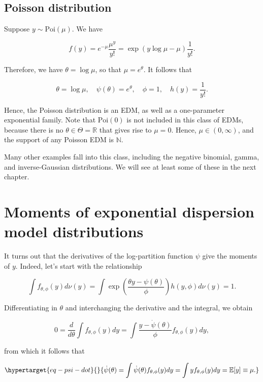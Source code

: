 \documentclass[
  11pt,
  letterpaper,
  oneside]{book}
\theoremstyle{plain}
\theoremstyle{plain}
\theoremstyle{definition}
\theoremstyle{definition}
\theoremstyle{plain}
\theoremstyle{remark}
\begin{document}
\hypertarget{poisson-distribution}{%
\subsection{Poisson distribution}\label{poisson-distribution}}

Suppose \(y \sim \text{Poi}(\mu)\). We have

\[
f(y) = e^{-\mu}\frac{\mu^y}{y!} = \exp(y \log \mu - \mu)\frac{1}{y!}.
\]

Therefore, we have \(\theta = \log \mu\), so that \(\mu = e^\theta\). It
follows that

\[
\theta = \log \mu, \quad \psi(\theta) = e^\theta,\quad \phi = 1, \quad h(y) = \frac{1}{y!}.
\]

Hence, the Poisson distribution is an EDM, as well as a one-parameter
exponential family. Note that \(\text{Poi}(0)\) is not included in this
class of EDMs, because there is no \(\theta \in \Theta = \mathbb{R}\)
that gives rise to \(\mu = 0\). Hence, \(\mu \in (0,\infty)\), and the
support of any Poisson EDM is \(\mathbb{N}\).

Many other examples fall into this class, including the negative
binomial, gamma, and inverse-Gaussian distributions. We will see at
least some of these in the next chapter.

\hypertarget{moments-of-exponential-dispersion-model-distributions}{%
\section{Moments of exponential dispersion model
distributions}\label{moments-of-exponential-dispersion-model-distributions}}

It turns out that the derivatives of the log-partition function \(\psi\)
give the moments of \(y\). Indeed, let's start with the relationship

\[
\int f_{\theta, \phi}(y)d\nu(y) = \int \exp\left(\frac{\theta y - \psi(\theta)}{\phi}\right)h(y, \phi) d\nu(y) = 1.
\]

Differentiating in \(\theta\) and interchanging the derivative and the
integral, we obtain

\[
0 = \frac{d}{d\theta} \int f_{\theta, \phi}(y)dy = \int \frac{y - \dot \psi(\theta)}{\phi}f_{\theta, \phi}(y) dy,
\]

from which it follows that

\begin{equation}\protect\hypertarget{eq-psi-dot}{}{
\dot \psi(\theta) = \int \dot \psi(\theta)f_{\theta, \phi}(y)dy = \int y f_{\theta, \phi}(y)dy = \mathbb{E}[y] \equiv \mu.
}\label{eq-psi-dot}\end{equation}
\end{document}
